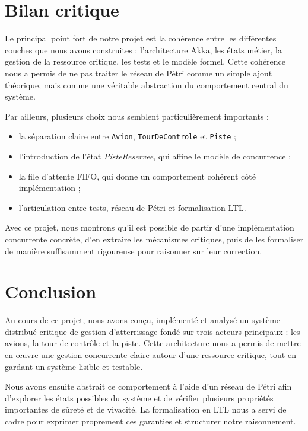 \documentclass[11pt,a4paper]{article}
\begin{document}
\section{Bilan critique}

Le principal point fort de notre projet est la cohérence entre les différentes couches que nous avons construites : l'architecture Akka, les états métier, la gestion de la ressource critique, les tests et le modèle formel. Cette cohérence nous a permis de ne pas traiter le réseau de Pétri comme un simple ajout théorique, mais comme une véritable abstraction du comportement central du système.

Par ailleurs, plusieurs choix nous semblent particulièrement importants :
\begin{itemize}
    \item la séparation claire entre \texttt{Avion}, \texttt{TourDeControle} et \texttt{Piste} ;
    \item l'introduction de l'état \emph{PisteReservee}, qui affine le modèle de concurrence ;
    \item la file d'attente FIFO, qui donne un comportement cohérent côté implémentation ;
    \item l'articulation entre tests, réseau de Pétri et formalisation LTL.
\end{itemize}

Avec ce projet, nous montrons qu'il est possible de partir d'une implémentation concurrente concrète, d'en extraire les mécanismes critiques, puis de les formaliser de manière suffisamment rigoureuse pour raisonner sur leur correction.

\section{Conclusion}

Au cours de ce projet, nous avons conçu, implémenté et analysé un système distribué critique de gestion d'atterrissage fondé sur trois acteurs principaux : les avions, la tour de contrôle et la piste. Cette architecture nous a permis de mettre en œuvre une gestion concurrente claire autour d'une ressource critique, tout en gardant un système lisible et testable.

Nous avons ensuite abstrait ce comportement à l'aide d'un réseau de Pétri afin d'explorer les états possibles du système et de vérifier plusieurs propriétés importantes de sûreté et de vivacité. La formalisation en LTL nous a servi de cadre pour exprimer proprement ces garanties et structurer notre raisonnement.
\end{document}
